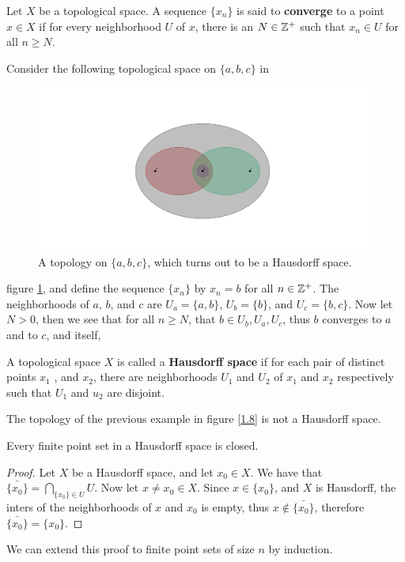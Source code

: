 \begin{definition}
    Let $X$ be a topological space. A sequence  $\{x_n\}$ is said to
    \textbf{converge} to a point  $x \in X$ if for every neighborhood  $U$ of
    $x$, there is an  $N \in \mathbb{Z}^+$ such that  $x_n \in U$ for all  $n \geq N$.		
\end{definition}

\begin{example}
    Consider the following topological space on $\{a,b,c\}$ in 
    \begin{figure}
        \centering
        \includegraphics[scale = 0.5]{Figures/Chapter1/hausdorffSpace.png}
        \caption{A topology on $\{a,b,c\}$, which turns out to be a Hausdorff
        space.}
        \label{fig1.8}
    \end{figure}
    figure \ref{fig1.8}, and define the sequence $\{x_n\}$ by  $x_n=b$ for all
    $n \in \mathbb{Z}^+$. The neighborhoods of  $a$, $b$, and $c$ are
    $U_a=\{a,b\}$,  $U_b=\{b\}$, and  $U_c=\{b,c\}$. Now let $N>0$, then we see
    that for all  $n \geq N$, that  $b \in U_b,U_a,U_c$, thus  $b$
    converges to  $a$ and to  $c$, and itself,
\end{example} 

\begin{definition}
    A topological space $X$ is called a \textbf{Hausdorff space} if for each
    pair of distinct points  $ x_1$ , and $x_2$, there are neighborhoods $ U_1$
    and $U_2$ of $ x_1$ and $ x_2$ respectively such that $ U_1$ and $ u_2$ are
    disjoint.
\end{definition}

\begin{example}
    The topology of the previous example in figure \ref{1.8} is not a Hausdorff
    space.
\end{example} 

\begin{theorem}\label{1.6.8}
    Every finite point set in a Hausdorff space is closed.
\end{theorem}
\begin{proof}
    Let $X$ be a Hausdorff space, and let  $x_0 \in X$. We have that
    $\bar{\{x_0\}}=\bigcap_{\{x_0\} \in U}{U}$. Now let $x \neq x_0 \in X$.
    Since $x \in \{x_0\}$, and $X$ is Hausdorff, the inters of the neighborhoods
    of $x$ and  $ x_0$ is empty, thus $x \notin \bar{\{x_0\}}$, therefore
    $\bar{\{x_0\}}=\{x_0\}$.
\end{proof}
\begin{remark}
    We can extend this proof to finite point sets of size $n$ by induction.
\end{remark}

